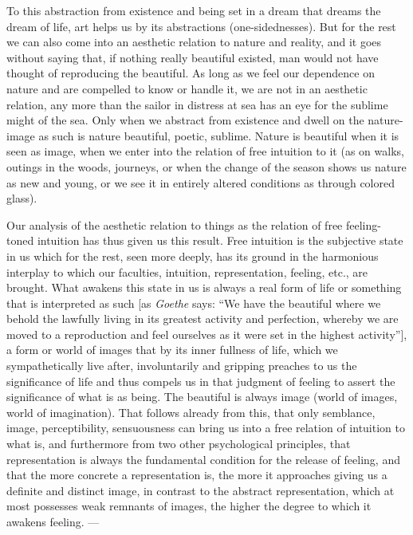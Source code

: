 \documentclass[12pt,a4paper,openany]{book}
\newcommand{\opage}[1]{\marginnote{\footnotesize\textit{[#1]}}}
\begin{document}
To this abstraction from existence and being set in a dream that dreams the dream of
life, art helps us by its abstractions (one-sidednesses). But for the rest we can also
come into an aesthetic relation to nature and reality, and it goes without saying that, if
nothing really beautiful existed, man would not have thought of reproducing
the beautiful. As long as we feel our dependence on nature and are compelled to know or
handle it, we are not in an aesthetic relation, any more than the sailor in distress at
sea has an eye for the sublime might of the sea. Only when we abstract from existence and
dwell on the nature-image as such is nature beautiful, poetic, sublime. Nature is
beautiful when it is seen as image, when we enter into the relation of free intuition to
it (as on walks, outings in the woods, journeys, or when the change of the season shows
us nature as new and young, or we see it in entirely altered conditions as through
colored glass).

Our analysis of the aesthetic relation to things as the relation of free feeling-toned
intuition has thus given us this result. Free intuition is the subjective state in us
which for the rest, seen more deeply, has its ground in the harmonious interplay to which
our faculties, intuition, representation, feeling, etc., are brought. What awakens this
state in us is always a
\setcounter{footnote}{0}%
\opage{264}real form of life or something that is interpreted as such [as \emph{Goethe} says:
``We have the beautiful where we behold the lawfully living in its greatest activity and
perfection, whereby we are moved to a reproduction and feel ourselves as it were set in
the highest activity''], a form or world of images that by its inner fullness of life,
which we sympathetically live after, involuntarily and gripping preaches to us the
significance of life and thus compels us in that judgment of feeling to assert the
significance of what is as being. The beautiful is always image (world of images, world of
imagination). That follows already from this, that only semblance,
image, perceptibility, sensuousness can bring us into a free relation of intuition to
what is, and furthermore from two other psychological principles, that representation is
always the fundamental condition for the release of feeling, and that the more concrete a
representation is, the more it approaches giving us a definite and distinct image, in
contrast to the abstract representation, which at most possesses weak remnants of images,
the higher the degree to which it awakens feeling. ---
\end{document}

